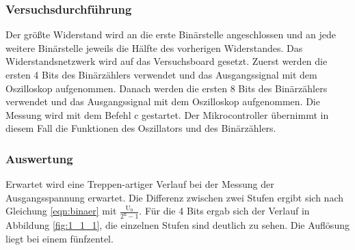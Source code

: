 \documentclass[12pt,a4paper]{article}
\begin{document}
\subsubsection*{Versuchsdurchführung}

Der größte Widerstand wird an die erste Binärstelle angeschlossen und an jede weitere Binärstelle jeweils die Hälfte des vorherigen Widerstandes. Das Widerstandsnetzwerk wird auf das Versuchsboard gesetzt. Zuerst werden die ersten 4 Bits des Binärzählers verwendet und das Ausgangssignal mit dem Oszilloskop aufgenommen. Danach werden die ersten 8 Bits des Binärzählers verwendet und das Ausgangssignal mit dem Oszilloskop aufgenommen. Die Messung wird mit dem Befehl c gestartet. Der Mikrocontroller übernimmt in diesem Fall die Funktionen des Oszillators und des Binärzählers.

\subsubsection*{Auswertung}

Erwartet wird eine Treppen-artiger Verlauf bei der Messung der Ausgangsspannung erwartet. Die Differenz zwischen zwei Stufen ergibt sich nach Gleichung \ref{eqn:binaer} mit $\frac{\text{U}_0}{2^\text{n}-1}$. Für die 4 Bits ergab sich der Verlauf in Abbildung \ref{fig:1_1_1}, die einzelnen Stufen sind deutlich zu sehen. Die Auflösung liegt bei einem fünfzentel.
\end{document}
